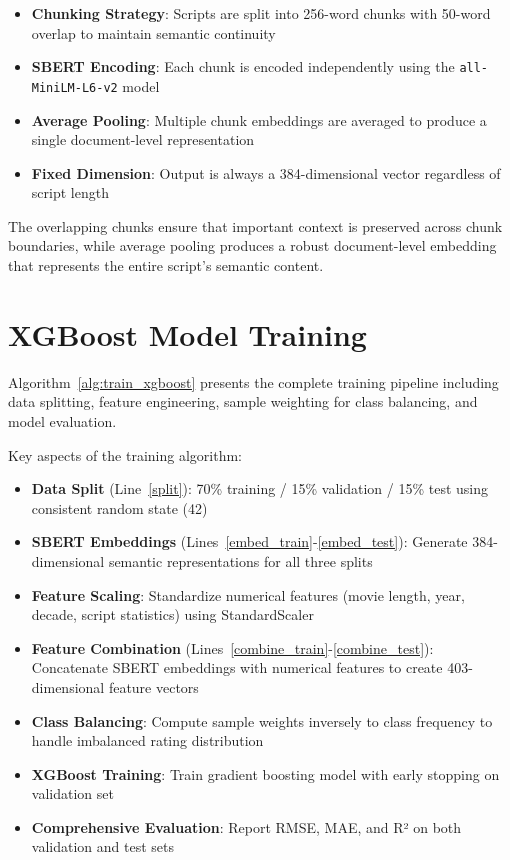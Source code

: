 \begin{itemize}
    \item \textbf{Chunking Strategy}: Scripts are split into 256-word chunks with 50-word overlap to maintain semantic continuity
    \item \textbf{SBERT Encoding}: Each chunk is encoded independently using the \texttt{all-MiniLM-L6-v2} model
    \item \textbf{Average Pooling}: Multiple chunk embeddings are averaged to produce a single document-level representation
    \item \textbf{Fixed Dimension}: Output is always a 384-dimensional vector regardless of script length
\end{itemize}

The overlapping chunks ensure that important context is preserved across chunk boundaries, while average pooling produces a robust document-level embedding that represents the entire script's semantic content.

\section{XGBoost Model Training}

Algorithm~\ref{alg:train_xgboost} presents the complete training pipeline including data splitting, feature engineering, sample weighting for class balancing, and model evaluation.



Key aspects of the training algorithm:

\begin{itemize}
    \item \textbf{Data Split} (Line~\ref{split}): 70\% training / 15\% validation / 15\% test using consistent random state (42)
    \item \textbf{SBERT Embeddings} (Lines~\ref{embed_train}-\ref{embed_test}): Generate 384-dimensional semantic representations for all three splits
    \item \textbf{Feature Scaling}: Standardize numerical features (movie length, year, decade, script statistics) using StandardScaler
    \item \textbf{Feature Combination} (Lines~\ref{combine_train}-\ref{combine_test}): Concatenate SBERT embeddings with numerical features to create 403-dimensional feature vectors
    \item \textbf{Class Balancing}: Compute sample weights inversely to class frequency to handle imbalanced rating distribution
    \item \textbf{XGBoost Training}: Train gradient boosting model with early stopping on validation set
    \item \textbf{Comprehensive Evaluation}: Report RMSE, MAE, and R² on both validation and test sets
\end{itemize}

